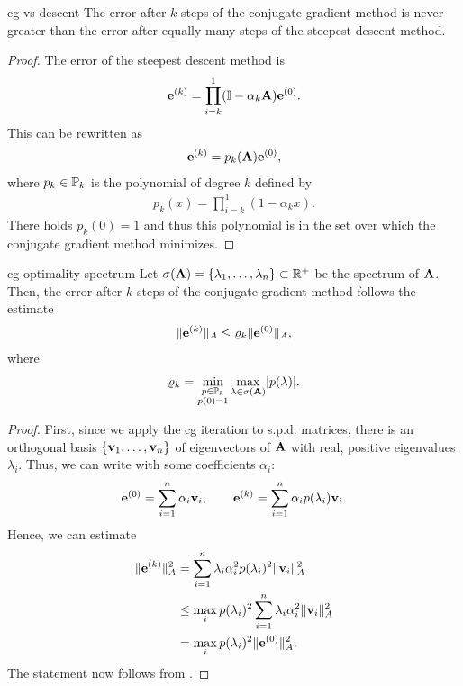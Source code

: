 \begin{Corollary}{cg-vs-descent}
  The error after $k$ steps of the conjugate gradient method is never
  greater than the error after equally many steps of the steepest
  descent method.
\end{Corollary}

\begin{proof}
  The error of the steepest descent method is
  \begin{gather}
    \ve^{(k)} = \prod_{i=k}^{1} (\id-\alpha_k\mata) \ve^{(0)}.
  \end{gather}
  This can be rewritten as
  \begin{gather}
    \ve^{(k)} = p_k(\mata) \ve^{(0)},
  \end{gather}
  where $p_k\in\P_k$ is the polynomial of degree $k$ defined by
  \begin{gather}
    p_k(x) = \prod_{i=k}^{1} (1-\alpha_kx).
  \end{gather}
  There holds $p_k(0)=1$ and thus this polynomial is in the set over
  which the conjugate gradient method minimizes.
\end{proof}

\begin{Corollary}{cg-optimality-spectrum}
  Let $\sigma(\mata) = \{\lambda_1,\dots,\lambda_n\} \subset \R^+$ be
  the spectrum of $\mata$. Then, the error after $k$ steps of the
  conjugate gradient method follows the estimate
  \begin{gather}
    \norm{\ve^{(k)}}_A \le \rho_k \norm{\ve^{(0)}}_A,
  \end{gather}
  where
  \begin{gather}
    \rho_k = \min_{\substack{p\in\P_k\\p(0) = 1}} \max_{\lambda\in\sigma(\mata)} \abs{p(\lambda)}.
  \end{gather}
\end{Corollary}

\begin{proof}
  First, since we apply the cg iteration to s.p.d. matrices, there is
  an orthogonal basis $\{\vv_1,\dots,\vv_n\}$ of eigenvectors of
  $\mata$ with real, positive eigenvalues $\lambda_i$. Thus, we can
  write with some coefficients $\alpha_i$:
  \begin{gather}
    \ve^{(0)} = \sum_{i=1}^n \alpha_i \vv_i,
    \qquad
    \ve^{(k)} = \sum_{i=1}^n \alpha_i p(\lambda_i) \vv_i.    
  \end{gather}
  Hence, we can estimate
  \begin{align}
    \norm{\ve^{(k)}}_A^2
    &= \sum_{i=1}^n \lambda_i\alpha_i^2 p(\lambda_i)^2 \norm{\vv_i}_A^2\\
    & \le \max_i p(\lambda_i)^2 \sum_{i=1}^n \lambda_i\alpha_i^2\norm{\vv_i}_A^2\\
    &= \max_i p(\lambda_i)^2 \norm{\ve^{(0)}}_A^2.
  \end{align}
  The statement now follows from .
\end{proof}


